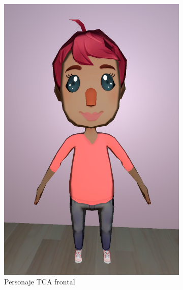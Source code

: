 \documentclass[12pt, a4paper,twoside,titlepage]{book}
\begin{document}
 \begin{figure}
\centering
\begin{subfigure}{.5\textwidth}
  \centering
  \includegraphics[width=.95\linewidth]{TGF/Artes/TCA_front.png}
  \caption{Personaje TCA frontal}
\end{subfigure}%
\begin{subfigure}{.5\textwidth}
  \centering

\end{subfigure}
\end{figure}
\end{document}
